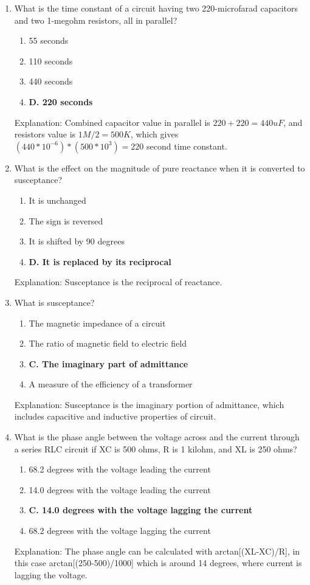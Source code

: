 \begin{enumerate}
      \item What is the time constant of a circuit having two 220-microfarad capacitors and two 1-megohm resistors, all in parallel?
      \begin{enumerate}
          \item  55 seconds
        \item  110 seconds
        \item  440 seconds
        \item \textbf{D. 220 seconds}
        \end{enumerate}
        \textcolor{myred}{Explanation:}
    Combined capacitor value in parallel is $220+220 = 440uF$, and resistors value is $1 M / 2 = 500K$, which gives $(440*10^{-6})* (500*10^3) = 220$ second time constant.
    
    \item What is the effect on the magnitude of pure reactance when it is converted to susceptance?
       \begin{enumerate}
       \item  It is unchanged
    \item  The sign is reversed
     \item  It is shifted by 90 degrees
       \item \textbf{D. It is replaced by its reciprocal}
      \end{enumerate}
        \textcolor{myred}{Explanation:}
         Susceptance is the reciprocal of reactance.
        
   \item What is susceptance?
        \begin{enumerate}
         \item  The magnetic impedance of a circuit
      \item  The ratio of magnetic field to electric field
         \item \textbf{C. The imaginary part of admittance}
      \item  A measure of the efficiency of a transformer
    \end{enumerate}
       \textcolor{myred}{Explanation:}
     Susceptance is the imaginary portion of admittance, which includes capacitive and inductive properties of circuit.

  \item What is the phase angle between the voltage across and the current through a series RLC circuit if XC is 500 ohms, R is 1 kilohm, and XL is 250 ohms?
    \begin{enumerate}
       \item  68.2 degrees with the voltage leading the current
       \item  14.0 degrees with the voltage leading the current
       \item \textbf{C. 14.0 degrees with the voltage lagging the current}
         \item  68.2 degrees with the voltage lagging the current
        \end{enumerate}
     \textcolor{myred}{Explanation:}
      The phase angle can be calculated with arctan[(XL-XC)/R], in this case arctan[(250-500)/1000] which is around 14 degrees, where current is lagging the voltage.


\end{enumerate}
